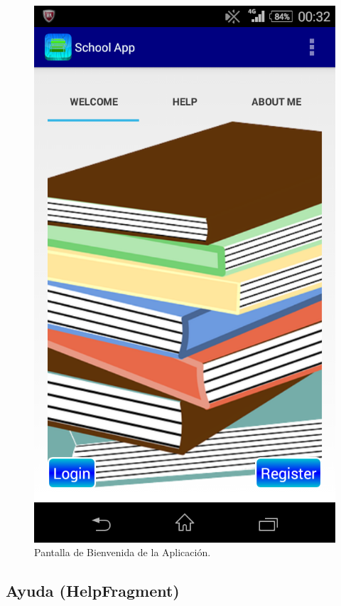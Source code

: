 			\begin{figure}[h !]
				\centering
				\includegraphics[scale=0.2]{Imagenes/App/welcome}
				\caption{Pantalla de Bienvenida de la Aplicación.}
				\label{fig:welcome}
			\end{figure}
		
		\subsection{Ayuda (HelpFragment)}
			
